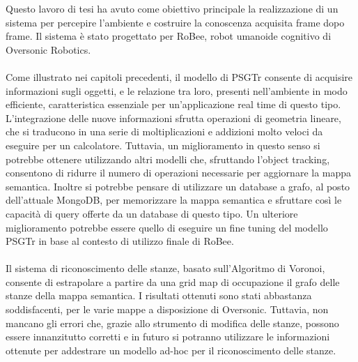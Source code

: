 Questo lavoro di tesi ha avuto come obiettivo principale la realizzazione di un sistema per percepire l'ambiente e costruire la conoscenza acquisita frame dopo frame. Il sistema è stato progettato per RoBee, robot umanoide cognitivo di Oversonic Robotics. \\\\
Come illustrato nei capitoli precedenti, il modello di PSGTr consente di acquisire informazioni sugli oggetti, e le relazione tra loro, presenti nell'ambiente in modo efficiente, caratteristica essenziale per un'applicazione real time di questo tipo. L'integrazione delle nuove informazioni sfrutta operazioni di geometria lineare, che si traducono in una serie di moltiplicazioni e addizioni molto veloci da eseguire per un calcolatore. Tuttavia, un miglioramento in questo senso si potrebbe ottenere utilizzando altri modelli che, sfruttando l'object tracking, consentono di ridurre il numero di operazioni necessarie per aggiornare la mappa semantica. Inoltre si potrebbe pensare di utilizzare un database a grafo, al posto dell'attuale MongoDB, per memorizzare la mappa semantica e sfruttare così le capacità di query offerte da un database di questo tipo. Un ulteriore miglioramento potrebbe essere quello di eseguire un fine tuning del modello PSGTr in base al contesto di utilizzo finale di RoBee.\\\\
Il sistema di riconoscimento delle stanze, basato sull'Algoritmo di Voronoi, consente di estrapolare a partire da una grid map di occupazione il grafo delle stanze della mappa semantica. I risultati ottenuti sono stati abbastanza soddisfacenti, per le varie mappe a disposizione di Oversonic. Tuttavia, non mancano gli errori che, grazie allo strumento di modifica delle stanze, possono essere innanzitutto corretti e in futuro si potranno utilizzare le informazioni ottenute per addestrare un modello ad-hoc per il riconoscimento delle stanze. \\\\
